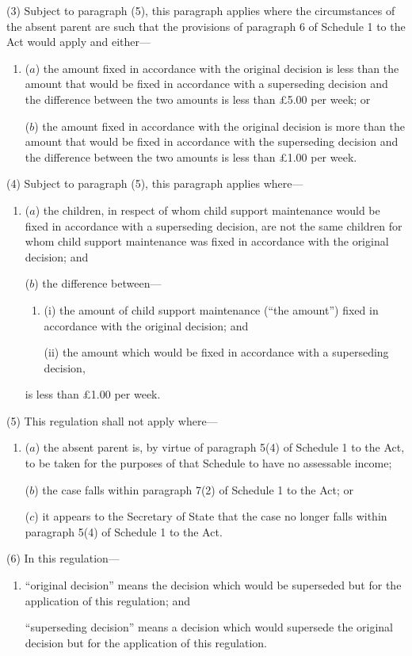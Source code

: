 \documentclass[a4paper,12pt]{article}
\begin{document}
(3) Subject to paragraph (5), this paragraph applies where the circumstances of the absent parent are such that the provisions of paragraph 6 of Schedule 1 to the Act would apply and either---
\begin{enumerate}\item[]
($a$) the amount fixed in accordance with the original decision is less than the amount that would be fixed in accordance with a superseding decision and the difference between the two amounts is less than £5$.$00 per week; or

($b$) the amount fixed in accordance with the original decision is more than the amount that would be fixed in accordance with the superseding decision and the difference between the two amounts is less than £1$.$00 per week.
\end{enumerate}

(4) Subject to paragraph (5), this paragraph applies where---
\begin{enumerate}\item[]
($a$) the children, in respect of whom child support maintenance would be fixed in accordance with a superseding decision, are not the same children for whom child support maintenance was fixed in accordance with the original decision; and

($b$) the difference between---
\begin{enumerate}\item[]
(i) the amount of child support maintenance (“the amount”) fixed in accordance with the original decision; and

(ii) the amount which would be fixed in accordance with a superseding decision, 
\end{enumerate}
is less than £1$.$00 per week.
\end{enumerate}

(5) This regulation shall not apply where---
\begin{enumerate}\item[]
($a$) the absent parent is, by virtue of paragraph 5(4) of Schedule 1 to the Act, to be taken for the purposes of that Schedule to have no assessable income;

($b$) the case falls within paragraph 7(2) of Schedule 1 to the Act; or

($c$) it appears to the Secretary of State that the case no longer falls within paragraph 5(4) of Schedule 1 to the Act.
\end{enumerate}

(6) In this regulation---
\begin{enumerate}\item[]
“original decision” means the decision which would be superseded but for the application of this regulation; and

“superseding decision” means a decision which would supersede the original decision but for the application of this regulation.
\end{enumerate}
\end{document}
